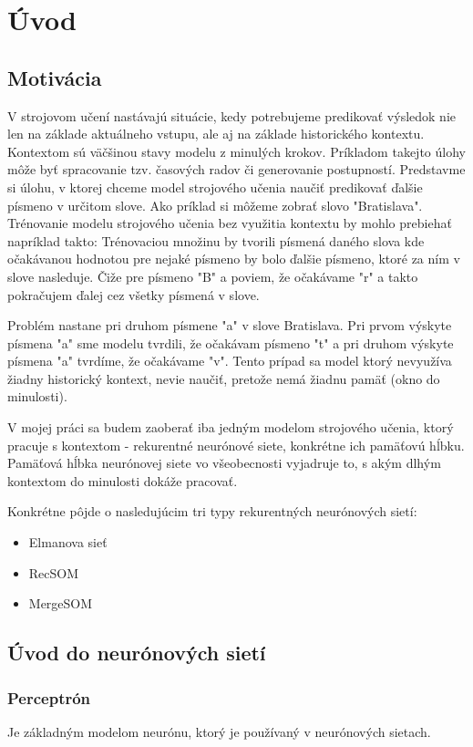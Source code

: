 \chapter{Úvod}

\section{Motivácia}
V strojovom učení nastávajú situácie, kedy potrebujeme predikovať výsledok nie len na 
základe aktuálneho vstupu, 
ale aj na základe historického kontextu. Kontextom sú väčšinou stavy modelu z minulých krokov.
Príkladom takejto úlohy môže byť spracovanie tzv. časových radov či generovanie postupností.
Predstavme si úlohu, v ktorej chceme model strojového učenia naučiť predikovať ďalšie písmeno v určitom slove. 
Ako príklad si môžeme zobrať slovo "Bratislava". 
Trénovanie modelu strojového učenia bez využitia kontextu by mohlo prebiehať napríklad takto:
Trénovaciou množinu by tvorili písmená daného slova kde očakávanou hodnotou pre nejaké písmeno by bolo ďalšie písmeno, ktoré za ním v slove nasleduje.
Čiže pre písmeno "B" a poviem, že očakávame "r" a takto pokračujem ďalej cez všetky písmená v slove.

Problém nastane pri druhom písmene "a" v slove Bratislava. Pri prvom výskyte písmena "a" sme modelu tvrdili, že očakávam písmeno "t" a 
pri druhom výskyte písmena "a" tvrdíme, že očakávame "v". 
Tento prípad sa model ktorý nevyužíva žiadny historický kontext, nevie naučiť, pretože nemá žiadnu pamäť (okno do minulosti).

V mojej práci sa budem zaoberať iba jedným modelom strojového učenia, ktorý pracuje s kontextom - rekurentné neurónové siete, konkrétne ich 
pamäťovú hĺbku. Pamäťová hĺbka neurónovej siete vo všeobecnosti vyjadruje to, s akým dlhým kontextom do minulosti dokáže pracovať.

Konkrétne pôjde o nasledujúcim tri typy rekurentných neurónových sietí:
\begin{itemize}
	\item Elmanova sieť
	\item RecSOM
	\item MergeSOM
\end{itemize}

\section{Úvod do neurónových sietí}

\subsection{Perceptrón}
Je základným modelom neurónu, ktorý je používaný v neurónových sietach.

